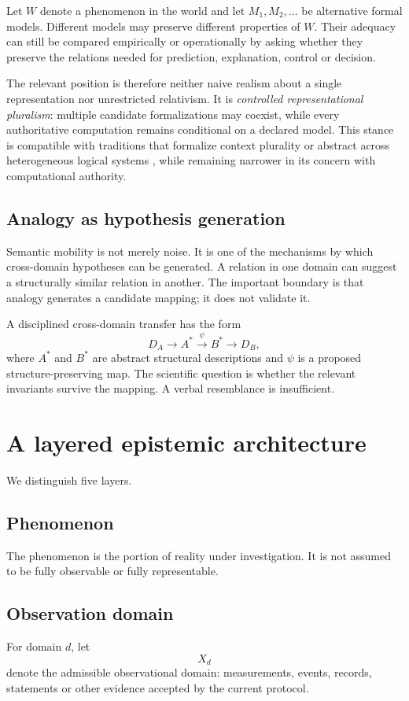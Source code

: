 \documentclass[11pt,a4paper]{article}
\begin{document}
Let $W$ denote a phenomenon in the world and let $M_1,M_2,\ldots$ be alternative formal models. Different models may preserve different properties of $W$. Their adequacy can still be compared empirically or operationally by asking whether they preserve the relations needed for prediction, explanation, control or decision.

The relevant position is therefore neither naive realism about a single representation nor unrestricted relativism. It is \emph{controlled representational pluralism}: multiple candidate formalizations may coexist, while every authoritative computation remains conditional on a declared model. This stance is compatible with traditions that formalize context plurality or abstract across heterogeneous logical systems \cite{mccarthy1993,goguenBurstall1992}, while remaining narrower in its concern with computational authority.

\subsection{Analogy as hypothesis generation}
Semantic mobility is not merely noise. It is one of the mechanisms by which cross-domain hypotheses can be generated. A relation in one domain can suggest a structurally similar relation in another. The important boundary is that analogy generates a candidate mapping; it does not validate it.

A disciplined cross-domain transfer has the form
\begin{equation}
D_A \rightarrow A^{*} \xrightarrow{\psi} B^{*} \rightarrow D_B,
\end{equation}
where $A^{*}$ and $B^{*}$ are abstract structural descriptions and $\psi$ is a proposed structure-preserving map. The scientific question is whether the relevant invariants survive the mapping. A verbal resemblance is insufficient.

\section{A layered epistemic architecture}
We distinguish five layers.

\subsection{Phenomenon}
The phenomenon is the portion of reality under investigation. It is not assumed to be fully observable or fully representable.

\subsection{Observation domain}
For domain $d$, let
\begin{equation}
X_d
\end{equation}
denote the admissible observational domain: measurements, events, records, statements or other evidence accepted by the current protocol.
\end{document}

